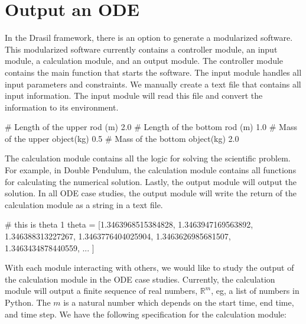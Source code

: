 \section{Output an ODE}
In the Drasil framework, there is an option to generate a modularized software. This modularized software currently contains a controller module, an input module, a calculation module, and an output module. The controller module contains the main function that starts the software. The input module handles all input parameters and constraints. We manually create a text file that contains all input information. The input module will read this file and convert the information to its environment. 

\begin{listing}[ht]
\begin{python1}
# Length of the upper rod (m)
2.0
# Length of the bottom rod (m)
1.0
# Mass of the upper object(kg)
0.5
# Mass of the bottom object(kg)
2.0
\end{python1}
\end{listing}

The calculation module contains all the logic for solving the scientific problem. For example, in Double Pendulum, the calculation module contains all functions for calculating the numerical solution. Lastly, the output module will output the solution. In all ODE case studies, the output module will write the return of the calculation module as a string in a text file. 

\begin{listing}[ht]
\begin{python1}
# this is theta 1
theta = [1.3463968515384828, 1.3463947169563892, 1.346388313227267, 1.3463776404025904, 1.3463626985681507, 1.3463434878440559, ... ]
\end{python1}
\label{code_outputfile}
\end{listing}

With each module interacting with others, we would like to study the output of the calculation module in the ODE case studies. Currently, the calculation module will output a finite sequence of real numbers, $\mathbb{R}^m$, eg, a list of numbers in Python. The $m$ is a natural number which depends on the start time, end time, and time step. We have the following specification for the calculation module:

